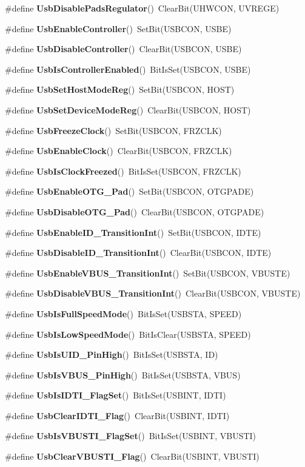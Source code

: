 \begin{CompactItemize}
\#define {\bf Usb\-Disable\-Pads\-Regulator}()~Clear\-Bit(UHWCON, UVREGE)
\item 
\#define {\bf Usb\-Enable\-Controller}()~Set\-Bit(USBCON, USBE)
\item 
\#define {\bf Usb\-Disable\-Controller}()~Clear\-Bit(USBCON, USBE)
\item 
\#define {\bf Usb\-Is\-Controller\-Enabled}()~Bit\-Is\-Set(USBCON, USBE)
\item 
\#define {\bf Usb\-Set\-Host\-Mode\-Reg}()~Set\-Bit(USBCON, HOST)
\item 
\#define {\bf Usb\-Set\-Device\-Mode\-Reg}()~Clear\-Bit(USBCON, HOST)
\item 
\#define {\bf Usb\-Freeze\-Clock}()~Set\-Bit(USBCON, FRZCLK)
\item 
\#define {\bf Usb\-Enable\-Clock}()~Clear\-Bit(USBCON, FRZCLK)
\item 
\#define {\bf Usb\-Is\-Clock\-Freezed}()~Bit\-Is\-Set(USBCON, FRZCLK)
\item 
\#define {\bf Usb\-Enable\-OTG\_\-Pad}()~Set\-Bit(USBCON, OTGPADE)
\item 
\#define {\bf Usb\-Disable\-OTG\_\-Pad}()~Clear\-Bit(USBCON, OTGPADE)
\item 
\#define {\bf Usb\-Enable\-ID\_\-Transition\-Int}()~Set\-Bit(USBCON, IDTE)
\item 
\#define {\bf Usb\-Disable\-ID\_\-Transition\-Int}()~Clear\-Bit(USBCON, IDTE)
\item 
\#define {\bf Usb\-Enable\-VBUS\_\-Transition\-Int}()~Set\-Bit(USBCON, VBUSTE)
\item 
\#define {\bf Usb\-Disable\-VBUS\_\-Transition\-Int}()~Clear\-Bit(USBCON, VBUSTE)
\item 
\#define {\bf Usb\-Is\-Full\-Speed\-Mode}()~Bit\-Is\-Set(USBSTA, SPEED)
\item 
\#define {\bf Usb\-Is\-Low\-Speed\-Mode}()~Bit\-Is\-Clear(USBSTA, SPEED)
\item 
\#define {\bf Usb\-Is\-UID\_\-Pin\-High}()~Bit\-Is\-Set(USBSTA, ID)
\item 
\#define {\bf Usb\-Is\-VBUS\_\-Pin\-High}()~Bit\-Is\-Set(USBSTA, VBUS)
\item 
\#define {\bf Usb\-Is\-IDTI\_\-Flag\-Set}()~Bit\-Is\-Set(USBINT, IDTI)
\item 
\#define {\bf Usb\-Clear\-IDTI\_\-Flag}()~Clear\-Bit(USBINT, IDTI)
\item 
\#define {\bf Usb\-Is\-VBUSTI\_\-Flag\-Set}()~Bit\-Is\-Set(USBINT, VBUSTI)
\item 
\#define {\bf Usb\-Clear\-VBUSTI\_\-Flag}()~Clear\-Bit(USBINT, VBUSTI)
\end{CompactItemize}


